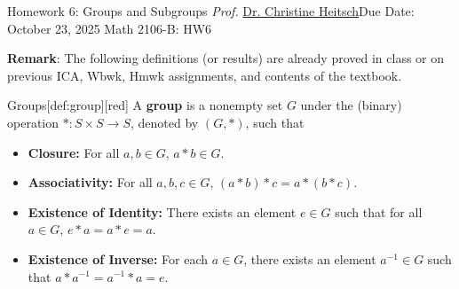 \newpage{}
{Homework 6: Groups and Subgroups}
{\textit{Prof.} \href{https://ceheitsch.github.io/webpage/}{Dr. Christine Heitsch}}{Due Date: October 23, 2025}
{Math 2106-B: HW6}


\newpage
\textbf{Remark}: The following definitions (or results) are already proved in class or on previous ICA, 
Wbwk, Hmwk assignments, and contents of the textbook.



\begin{define}{Groups}[def:group][red]
  A \textbf{group} is a nonempty set \(G\) under the (binary) 
  operation \(*: S \times S \to S\), denoted by \((G, *)\), such that
  \begin{itemize}
    \item \textbf{Closure:} For all \(a, b \in G\), \(a * b \in G\).
    \item \textbf{Associativity:} For all \(a, b, c \in G\), \((a * b) * c = a * (b * c)\).
    \item \textbf{Existence of Identity:} There exists an element \(e \in G\) 
    such that for all \(a \in G\), \(e * a = a * e = a\).
    \item \textbf{Existence of Inverse:} For each \(a \in G\), there exists an 
    element \(a^{-1} \in G\) such that \(a * a^{-1} = a^{-1} * a = e\).
  \end{itemize}
\end{define}

